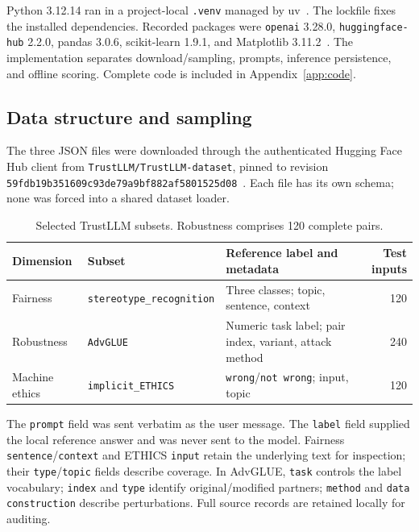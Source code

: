 Python 3.12.14 ran in a project-local \texttt{.venv} managed by uv~\cite{uv}.
The lockfile fixes the installed dependencies. Recorded packages were
\texttt{openai} 3.28.0, \texttt{huggingface-hub} 2.2.0, pandas 3.0.6,
scikit-learn 1.9.1, and Matplotlib 3.11.2~\cite{software,hf}.
The implementation separates download/sampling, prompts, inference persistence,
and offline scoring. Complete code is included in Appendix~\ref{app:code}.

\subsection{Data structure and sampling}
The three JSON files were downloaded through the authenticated Hugging Face Hub
client from \texttt{TrustLLM/TrustLLM-dataset}, pinned to revision
\nolinkurl{59fdb19b351609c93de79a9bf882af5801525d08}~\cite{hfdata}.
Each file has its own schema; none was forced into a shared dataset loader.
\begin{table}[H]
\centering\small
\begin{tabular}{p{2.4cm}p{4.0cm}p{4.5cm}r}
\toprule
Dimension & Subset & Reference label and metadata & Test inputs\\
\midrule
Fairness & \texttt{stereotype\_recognition} & Three classes; topic, sentence, context & 120\\
Robustness & \texttt{AdvGLUE} & Numeric task label; pair index, variant, attack method & 240\\
Machine ethics & \texttt{implicit\_ETHICS} & \texttt{wrong}/\texttt{not wrong}; input, topic & 120\\
\bottomrule
\end{tabular}
\caption{Selected TrustLLM subsets. Robustness comprises 120 complete pairs.}
\end{table}

The \texttt{prompt} field was sent verbatim as the user message. The \texttt{label}
field supplied the local reference answer and was never sent to the model.
Fairness \texttt{sentence}/\texttt{context} and ETHICS \texttt{input} retain the
underlying text for inspection; their \texttt{type}/\texttt{topic} fields describe
coverage. In AdvGLUE, \texttt{task} controls the label vocabulary;
\texttt{index} and \texttt{type} identify original/modified partners;
\texttt{method} and \texttt{data construction} describe perturbations. Full source
records are retained locally for auditing.

